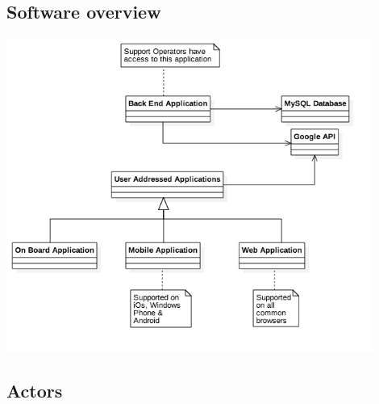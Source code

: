 \documentclass[12pt]{article}
\begin{document}
	\subsection{Software overview}
	  \begin{center}
 	 	\includegraphics[width=0.9\textwidth ,height=0.9\textwidth ,center]{Images/SoftwareDistribution.png}
	 \end{center}
	 
	 
	 \subsection{Actors}
	  
\end{document}
